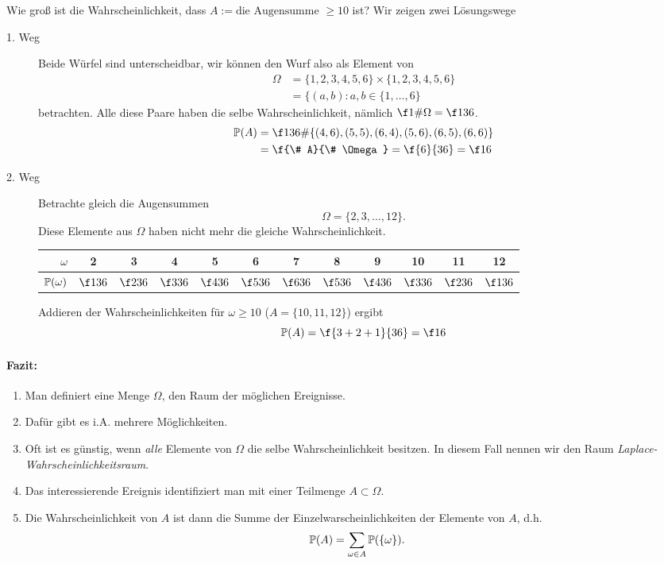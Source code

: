 \begin{ex} \label{0.2.1}
	Wie groß ist die Wahrscheinlichkeit, dass $A := \text{die Augensumme $\ge 10$}$ ist?
	Wir zeigen zwei Lösungswege
	\begin{description}
		\item[1. Weg]
			Beide Würfel sind unterscheidbar, wir können den Wurf also als Element von
			\begin{align*}
				\Omega
				&= \{ 1,2,3,4,5,6 \} \times \{ 1,2,3,4,5,6 \} \\
				&= \{ (a,b): a,b \in \{ 1, \dotsc, 6 \}
			\end{align*}
			betrachten.
			Alle diese Paare haben die selbe Wahrscheinlichkeit, nämlich $\f 1{\# \Omega} = \f 1{36}$.
			\begin{align*}
				\P(A)
				&= \f 1{36} \# \{ (4,6), (5,5), (6,4), (5,6), (6,5), (6,6) \} \\
				&= \f {\# A}{\# \Omega}
				= \f {6}{36}
				= \f 16
			\end{align*}
		\item[2. Weg]
			Betrachte gleich die Augensummen
			\[
				\Omega
				= \{ 2, 3, \dotsc, 12 \}.
			\]
			Diese Elemente aus $\Omega$ haben nicht mehr die gleiche Wahrscheinlichkeit.
			\begin{table}
				\centering
				\begin{tabular}{r|ccccccccccc}
					$\omega$ & 2 & 3 & 4 & 5 & 6 & 7 & 8 & 9 & 10 & 11 & 12 \\ \hline
					$\P(\omega)$ & $\f 1{36}$ & $\f 2{36}$ & $\f 3{36}$ & $\f 4{36}$ & $\f 5{36}$ &$\f 6{36}$ &$\f 5{36}$ &$\f 4{36}$ &$\f 3{36}$ &$\f 2{36}$ &$\f 1{36}$
				\end{tabular}
			\end{table}
			Addieren der Wahrscheinlichkeiten für $\omega \ge 10$ ($A = \{10,11,12\}$) ergibt
			\[
				\P(A)
				= \f {3+2+1}{36}
				= \f 16
			\]
	\end{description}
\end{ex}

\paragraph{Fazit:}
\begin{enumerate}[1.]
	\item
		Man definiert eine Menge $\Omega$, den Raum der möglichen Ereignisse.
	\item
		Dafür gibt es i.A. mehrere Möglichkeiten.
	\item
		Oft ist es günstig, wenn \emph{alle} Elemente von $\Omega$ die selbe Wahrscheinlichkeit besitzen.
		In diesem Fall nennen wir den Raum \emph{Laplace-Wahrscheinlichkeitsraum}.
	\item
		Das interessierende Ereignis identifiziert man mit einer Teilmenge $A \subset \Omega$.
	\item
		Die Wahrscheinlichkeit von $A$ ist dann die Summe der Einzelwarscheinlichkeiten der Elemente von $A$, d.h.
		\[
			\P(A) = \sum_{\omega \in A} \P(\{\omega\}).
		\]
\end{enumerate}

